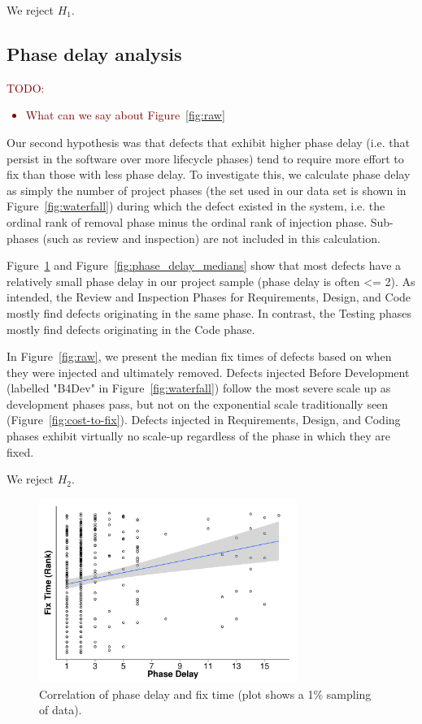 \documentclass{sig-alternate}
\newcommand{\todo}[1]{\textcolor{Maroon}{TODO: #1}}
\newcommand{\bi}{\begin{itemize}[leftmargin=0.4cm]}
\newcommand{\ei}{\end{itemize}}
\newcommand{\fig}[1]{Figure~\ref{fig:#1}}
\begin{document}
We reject $H_1$.

\subsection{Phase delay analysis}
\todo{
\bi
    \item What can we say about \fig{raw}
\ei
}

Our second hypothesis was that defects that exhibit higher phase delay (i.e. that persist in the software over more lifecycle phases) tend to require more effort to fix than those with less phase delay. To investigate this, we calculate phase delay as simply the number of project phases (the set used in our data set is shown in \fig{waterfall}) during which the defect existed in the system, i.e. the ordinal rank of removal phase minus the ordinal rank of injection phase. Sub-phases (such as review and inspection) are not included in this calculation.

\fig{correlation} and \fig{phase_delay_medians} show that most defects have a relatively small phase delay in our project sample (phase delay is often <= 2). As intended, the Review and Inspection Phases for Requirements, Design, and Code mostly find defects originating in the same phase. In contrast, the Testing phases mostly find defects originating in the Code phase. 

In \fig{raw}, we present the median fix times of defects based on when they were injected and ultimately removed. Defects injected Before Development (labelled "B4Dev" in \fig{waterfall}) follow the most severe scale up as development phases pass, but not on the exponential scale traditionally seen (\fig{cost-to-fix}). Defects injected in Requirements, Design, and Coding phases exhibit virtually no scale-up regardless of the phase in which they are fixed.

We reject $H_2$.







\begin{figure}[!ht]
\begin{center}
\includegraphics[width=3.3in]{corr.pdf}
\end{center}
\caption{Correlation of phase delay and fix time (plot shows a 1\% sampling of data).}
\label{fig:correlation}
\end{figure}
\end{document}
